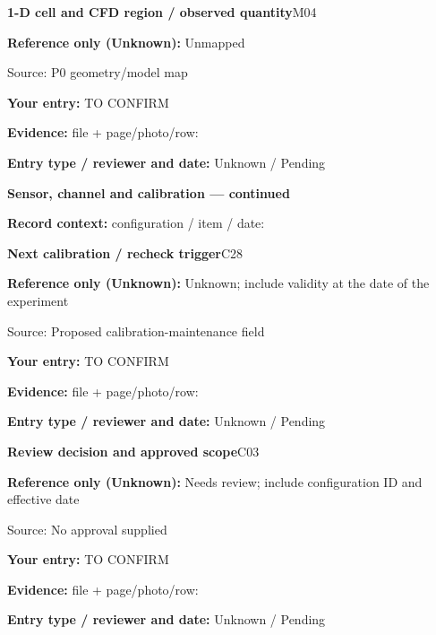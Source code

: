\documentclass[11pt]{article}
\begin{document}
\par\noindent\begin{minipage}{\textwidth}\small
{\color{navy}\bfseries 1-D cell and CFD region / observed quantity}\hfill M04\par
\colorbox{pale}{\parbox{\dimexpr\linewidth-2\fboxsep\relax}{
\textbf{Reference only (Unknown):} Unmapped\par
{\footnotesize Source: P0 geometry/model map}}}\par
\textbf{Your entry:} {\color{muted}TO CONFIRM}\enspace\hrulefill\par
{\footnotesize\textbf{Evidence:} file + page/photo/row: \hrulefill\par
\textbf{Entry type / reviewer and date:} Unknown / Pending\par
}\end{minipage}\par\vspace{5pt}
\clearpage
{\large\bfseries Sensor, channel and calibration --- continued}\par
\textbf{Record context:} configuration / item / date: \hrulefill\par
\par\noindent\begin{minipage}{\textwidth}\small
{\color{navy}\bfseries Next calibration / recheck trigger}\hfill C28\par
\colorbox{pale}{\parbox{\dimexpr\linewidth-2\fboxsep\relax}{
\textbf{Reference only (Unknown):} Unknown; include validity at the date of the experiment\par
{\footnotesize Source: Proposed calibration-maintenance field}}}\par
\textbf{Your entry:} {\color{muted}TO CONFIRM}\enspace\hrulefill\par
{\footnotesize\textbf{Evidence:} file + page/photo/row: \hrulefill\par
\textbf{Entry type / reviewer and date:} Unknown / Pending\par
}\end{minipage}\par\vspace{5pt}
\par\noindent\begin{minipage}{\textwidth}\small
{\color{navy}\bfseries Review decision and approved scope}\hfill C03\par
\colorbox{pale}{\parbox{\dimexpr\linewidth-2\fboxsep\relax}{
\textbf{Reference only (Unknown):} Needs review; include configuration ID and effective date\par
{\footnotesize Source: No approval supplied}}}\par
\textbf{Your entry:} {\color{muted}TO CONFIRM}\enspace\hrulefill\par
{\footnotesize\textbf{Evidence:} file + page/photo/row: \hrulefill\par
\textbf{Entry type / reviewer and date:} Unknown / Pending\par
}\end{minipage}\par\vspace{5pt}
\end{document}
